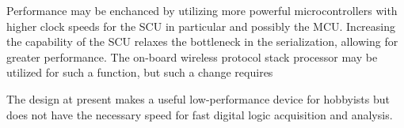 Performance may be enchanced by utilizing more powerful microcontrollers with
higher clock speeds for the SCU in particular and possibly the MCU. Increasing 
the capability of the SCU relaxes the bottleneck in the serialization, allowing for greater performance. The on-board wireless protocol stack processor may be 
utilized for such a function, but such a change requires 

The design at present makes a useful low-performance device for hobbyists but 
does not have the necessary speed for fast digital logic acquisition and 
analysis. 
